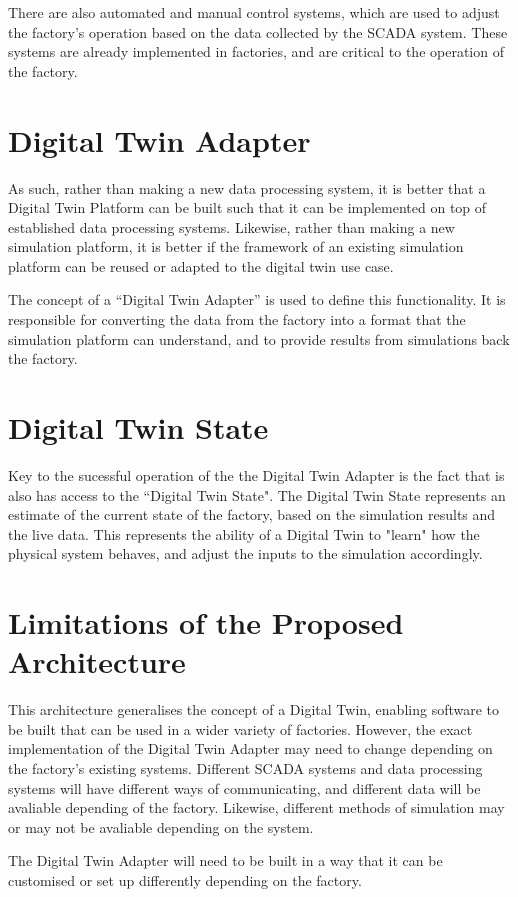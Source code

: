 There are also automated and manual control systems, which are used to adjust the factory's operation based on the data collected by the SCADA system.
These systems are already implemented in factories, and are critical to the operation of the factory.

\section{Digital Twin Adapter}

As such, rather than making a new data processing system, it is better that a Digital Twin Platform can be built such that it can be implemented on top of established data processing systems. Likewise, rather than making a new simulation platform, it is better if the framework of an existing simulation platform can be reused or adapted to the digital twin use case.

The concept of a ``Digital Twin Adapter'' is used to define this functionality. It is responsible for converting the data from the factory into a format that the simulation platform can understand, and to provide results from simulations back the factory.


\section{Digital Twin State}

Key to the sucessful operation of the the Digital Twin Adapter is the fact that is also has access to the ``Digital Twin State". The Digital Twin State represents an estimate of the current state of the factory, based on the simulation results and the live data. 
This represents the ability of a Digital Twin to "learn" how the physical system behaves, and adjust the inputs to the simulation accordingly.



\section{Limitations of the Proposed Architecture}

This architecture generalises the concept of a Digital Twin, enabling software to be built that can be used in a wider variety of factories. However, the exact implementation of the Digital Twin Adapter may need to change depending on the factory's existing systems. Different SCADA systems and data processing systems will have different ways of communicating, and different data will be avaliable depending of the factory. Likewise, different methods of simulation may or may not be avaliable depending on the system. 

The Digital Twin Adapter will need to be built in a way that it can be customised or set up differently depending on the factory. 
